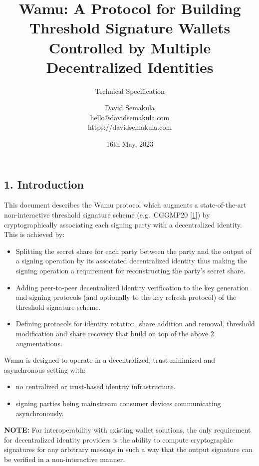 \documentclass[
]{article}
\title{Wamu: A Protocol for Building Threshold Signature Wallets
Controlled by Multiple Decentralized Identities}
\subtitle{Technical Specification}
\author{David Semakula\\
hello@davidsemakula.com\\
https://davidsemakula.com}
\date{16th May, 2023}
\providecommand{\tightlist}{%
  \setlength{\itemsep}{0pt}\setlength{\parskip}{0pt}}
\begin{document}
\maketitle

{
\setcounter{tocdepth}{3}
\tableofcontents
}
\hypertarget{introduction}{%
\subsection{1. Introduction}\label{introduction}}

This document describes the Wamu protocol which augments a
state-of-the-art non-interactive threshold signature scheme
(e.g.~CGGMP20 {[}\protect\hyperlink{ref-cggmp20}{1}{]}) by
cryptographically associating each signing party with a decentralized
identity. This is achieved by:

\begin{itemize}
\tightlist
\item
  Splitting the secret share for each party between the party and the
  output of a signing operation by its associated decentralized identity
  thus making the signing operation a requirement for reconstructing the
  party's secret share.
\item
  Adding peer-to-peer decentralized identity verification to the key
  generation and signing protocols (and optionally to the key refresh
  protocol) of the threshold signature scheme.
\item
  Defining protocols for identity rotation, share addition and removal,
  threshold modification and share recovery that build on top of the
  above 2 augmentations.
\end{itemize}

Wamu is designed to operate in a decentralized, trust-minimized and
asynchronous setting with:

\begin{itemize}
\tightlist
\item
  no centralized or trust-based identity infrastructure.
\item
  signing parties being mainstream consumer devices communicating
  asynchronously.
\end{itemize}

\textbf{NOTE:} For interoperability with existing wallet solutions, the
only requirement for decentralized identity providers is the ability to
compute cryptographic signatures for any arbitrary message in such a way
that the output signature can be verified in a non-interactive manner.
\end{document}

